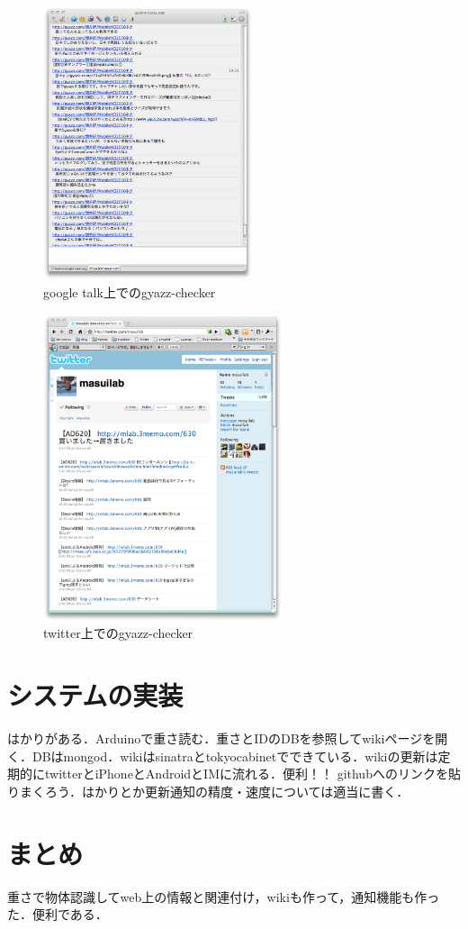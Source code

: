 \begin{figure}
  \begin{center}
    \includegraphics[height=80mm]{img/gyazz-checker.png}
  \end{center}
  \caption{google talk上でのgyazz-checker}
  \label{fig:checker}
\end{figure}

\begin{figure}
  \begin{center}
    \includegraphics[height=90mm]{img/gyazz-twitter.png}
  \end{center}
  \caption{twitter上でのgyazz-checker}
  \label{fig:twitter}
\end{figure}

\section{システムの実装}
はかりがある．Arduinoで重さ読む．重さとIDのDBを参照してwikiページを開く．DBはmongod．wikiはsinatraとtokyocabinetでできている．wikiの更新は定期的にtwitterとiPhoneとAndroidとIMに流れる．便利！！
githubへのリンクを貼りまくろう．はかりとか更新通知の精度・速度については適当に書く．


\section{まとめ}
重さで物体認識してweb上の情報と関連付け，wikiも作って，通知機能も作った．便利である．
